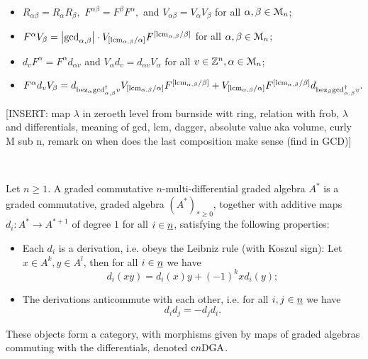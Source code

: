 \begin{thm}
\begin{itemize}
 \item $R_{\alpha\beta} = R_\alpha R_\beta,$ $F^{\alpha\beta} = F^\beta F^\alpha,$ and $V_{\alpha\beta} = V_\alpha V_\beta$ for all $\alpha, \beta \in \mathcal{M}_n$;
 \item $F^\alpha V_\beta = \left\vert\mathrm{gcd}_{\alpha,\beta}\right\vert \cdot V_{[\mathrm{lcm}_{\alpha,\beta} / \alpha]}F^{[\mathrm{lcm}_{\alpha,\beta} / \beta]}$ %
    for all $\alpha, \beta \in \mathcal{M}_n$;
 \item $d_v F^\alpha = F^\alpha d_{\alpha v}$ and $V_\alpha d_v = d_{\alpha v} V_\alpha$ for all $v \in \mathbb{Z}^n, \alpha \in \mathcal{M}_n$;
 \item $F^\alpha d_v V_\beta = d_{\bez_{\alpha}\gcd_{\alpha,\beta}^\dagger v} %
    V_{[\lcm_{\alpha,\beta} / \alpha]} F^{[\lcm_{\alpha,\beta} / \beta]} + %
    V_{[\lcm_{\alpha,\beta} / \alpha]} F^{[\lcm_{\alpha,\beta} / \beta]}%
    d_{\bez_{\beta}\gcd_{\alpha,\beta}^\dagger v}.$
\end{itemize}
[INSERT: map $\lambda$ in zeroeth level from burnside witt ring, relation with frob, $\lambda$ and
differentials, meaning of gcd, lcm, dagger, absolute value aka volume, curly M sub n, remark on
when does the last composition make sense (find in GCD)]
\end{thm}
%
%
\begin{defn}\label{def_bwc}%
\\
\end{defn}
%
%
\begin{defn}\label{def_cmdga}
Let $n \geq 1$. A graded commutative $n$-multi-differential graded algebra $A^*$ is a graded commutative, graded algebra $(A^*)_{* \geq 0}$, together with additive maps $d_i: A^* \to A^{*+1}$ of degree $1$ for all $i \in \underline{n}$, satisfying the following properties:
\begin{itemize}
\item Each $d_i$ is a derivation, i.e. obeys the Leibniz rule (with Koszul sign): Let $x \in A^k, y \in A^l$, then for all $i \in \underline{n}$ we have%
$$d_i (xy) = d_i(x)y + (-1)^{k}xd_i(y);$$
\item The derivations anticommute with each other, i.e. for all $i,j \in \underline{n}$ we have%
$$d_i d_j = - d_j d_i.$$
\end{itemize}
These objects form a category, with morphisms given by maps of graded algebras commuting with the differentials, denoted $\mathrm{c}n\mathrm{DGA}$.
\end{defn}
